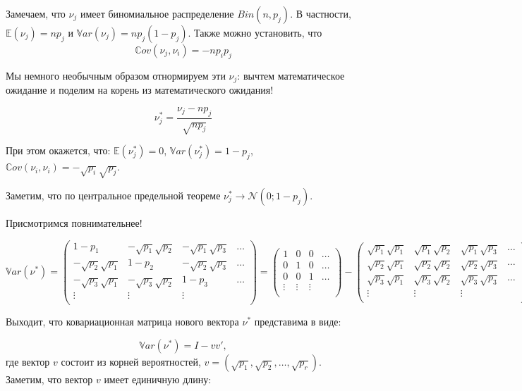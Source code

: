 \documentclass[11pt,russian,]{article}
\newcommand{\cN}{\mathcal{N}}
\newcommand{\E}{\mathbb{E}}
\newcommand{\1}{\mathbbm{1}}
\newcommand{\Var}{\mathbb{V}ar}
\newcommand{\Cov}{\mathbb{C}ov}
\begin{document}
Замечаем, что \(\nu_j\) имеет биномиальное распределение
\(Bin(n, p_j)\). В частности, \(\E(\nu_j) = np_j\) и
\(\Var(\nu_j)=n p_j (1- p_j)\). Также можно установить, что \[
\Cov(\nu_j, \nu_i) = -np_ip_j
\]

Мы немного необычным образом отнормируем эти \(\nu_j\): вычтем
математическое ожидание и поделим на корень из математического ожидания!

\[
\nu_j^* = \frac{\nu_j - np_j}{\sqrt{np_j}}
\]

При этом окажется, что: \(\E(\nu_j^*) = 0\),
\(\Var(\nu_j^*) = 1 - p_j\),
\(\Cov(\nu_i, \nu_i) = - \sqrt{p_i}\sqrt{p_j}\).

Заметим, что по центральное предельной теореме
\(\nu_j^* \to \cN(0; 1 - p_j)\).

Присмотримся повнимательнее!

\[
\Var(\nu^*) = \begin{pmatrix}
1 - p_1 & -\sqrt{p_1}\sqrt{p_2} & -\sqrt{p_1}\sqrt{p_3} & \ldots \\
-\sqrt{p_2}\sqrt{p_1} & 1 - p_2 & -\sqrt{p_2}\sqrt{p_3} & \ldots \\
-\sqrt{p_3}\sqrt{p_1} & -\sqrt{p_3}\sqrt{p_2} & 1 - p_3  & \ldots \\
\vdots & \vdots & \vdots &  \\
\end{pmatrix} = 
\begin{pmatrix}
1 & 0 & 0 & \ldots \\
0 & 1 & 0 & \ldots \\
0 & 0 & 1 & \ldots \\
\vdots & \vdots & \vdots &  \\
\end{pmatrix} - \begin{pmatrix}
\sqrt{p_1}\sqrt{p_1} & \sqrt{p_1}\sqrt{p_2} & \sqrt{p_1}\sqrt{p_3} & \ldots \\
\sqrt{p_2}\sqrt{p_1} & \sqrt{p_2}\sqrt{p_2} & \sqrt{p_2}\sqrt{p_3} & \ldots \\
\sqrt{p_3}\sqrt{p_1} & \sqrt{p_3}\sqrt{p_2} & \sqrt{p_3}\sqrt{p_3}  & \ldots \\
\vdots & \vdots & \vdots &  \\
\end{pmatrix}
\]

Выходит, что ковариационная матрица нового вектора \(\nu^*\) представима
в виде:

\[
\Var(\nu^*) = I - vv',
\] где вектор \(v\) состоит из корней вероятностей,
\(v= (\sqrt{p_1}, \sqrt{p_2}, \ldots, \sqrt{p_r})\). Заметим, что вектор
\(v\) имеет единичную длину:
\end{document}
